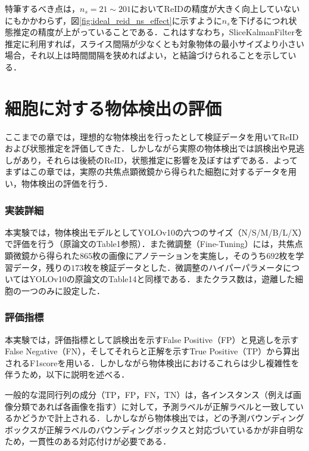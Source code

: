     特筆するべき点は，$n_s = 21 \sim 201$においてReIDの精度が大きく向上していないにもかかわらず，図\ref{fig:ideal_reid_ns_effect}に示すように$n_s$を下げるにつれ状態推定の精度が上がっていることである．これはすなわち，SliceKalmanFilterを推定に利用すれば，スライス間隔が少なくとも対象物体の最小サイズより小さい場合，それ以上は時間間隔を狭めればよい，と結論づけられることを示している．

\section{細胞に対する物体検出の評価}
\label{sec:cell_detection}

ここまでの章では，理想的な物体検出を行ったとして検証データを用いてReIDおよび状態推定を評価してきた．しかしながら実際の物体検出では誤検出や見逃しがあり，それらは後続のReID，状態推定に影響を及ぼすはずである．よってまずはこの章では，実際の共焦点顕微鏡から得られた細胞に対するデータを用い，物体検出の評価を行う．

    \subsubsection{実装詳細}

    本実験では，物体検出モデルとしてYOLOv10の六つのサイズ（N/S/M/B/L/X）で評価を行う（原論文\cite{wang2024yolov10}のTable1参照）．また微調整（Fine-Tuning）には，共焦点顕微鏡から得られた$865$枚の画像にアノテーションを実施し，そのうち$692$枚を学習データ，残りの$173$枚を検証データとした．微調整のハイパーパラメータについてはYOLOv10の原論文\cite{wang2024yolov10}のTable14と同様である．またクラス数は，遊離した細胞の一つのみに設定した．

    \subsubsection{評価指標}

    本実験では，評価指標として誤検出を示すFalse Positive（FP）と見逃しを示すFalse Negative（FN），そしてそれらと正解を示すTrue Positive（TP）から算出されるF1scoreを用いる．しかしながら物体検出におけるこれらは少し複雑性を伴うため，以下に説明を述べる．

    一般的な混同行列の成分（TP，FP，FN，TN）は，各インスタンス（例えば画像分類であれば各画像を指す）に対して，予測ラベルが正解ラベルと一致しているかどうかで計上される．しかしながら物体検出では，どの予測バウンディングボックスが正解ラベルのバウンディングボックスと対応づいているかが非自明なため，一貫性のある対応付けが必要である．

